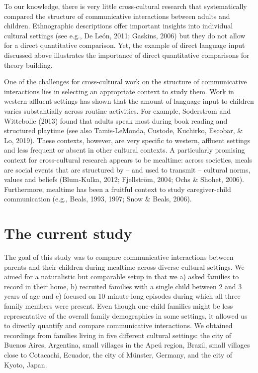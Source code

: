 \documentclass[
  man,floatsintext]{apa6}
\begin{document}
To our knowledge, there is very little cross-cultural research that systematically compared the structure of communicative interactions between adults and children. Ethnographic descriptions offer important insights into individual cultural settings (see e.g., De León, 2011; Gaskins, 2006) but they do not allow for a direct quantitative comparison. Yet, the example of direct language input discussed above illustrates the importance of direct quantitative comparisons for theory building.

One of the challenges for cross-cultural work on the structure of communicative interactions lies in selecting an appropriate context to study them. Work in western-affluent settings has shown that the amount of language input to children varies substantially across routine activities. For example, Soderstrom and Wittebolle (2013) found that adults speak most during book reading and structured playtime (see also Tamis-LeMonda, Custode, Kuchirko, Escobar, \& Lo, 2019). These contexts, however, are very specific to western, affluent settings and less frequent or absent in other cultural contexts. A particularly promising context for cross-cultural research appears to be mealtime: across societies, meals are social events that are structured by -- and used to transmit -- cultural norms, values and beliefs (Blum-Kulka, 2012; Fjellström, 2004; Ochs \& Shohet, 2006). Furthermore, mealtime has been a fruitful context to study caregiver-child communication (e.g., Beals, 1993, 1997; Snow \& Beals, 2006).

\hypertarget{the-current-study}{%
\section{The current study}\label{the-current-study}}

The goal of this study was to compare communicative interactions between parents and their children during mealtime across diverse cultural settings. We aimed for a naturalistic but comparable setup in that we a) asked families to record in their home, b) recruited families with a single child between 2 and 3 years of age and c) focused on 10 minute-long episodes during which all three family members were present. Even though one-child families might be less representative of the overall family demographics in some settings, it allowed us to directly quantify and compare communicative interactions. We obtained recordings from families living in five different cultural settings: the city of Buenos Aires, Argentina, small villages in the Apeú region, Brazil, small villages close to Cotacachi, Ecuador, the city of Münster, Germany, and the city of Kyoto, Japan.
\end{document}
